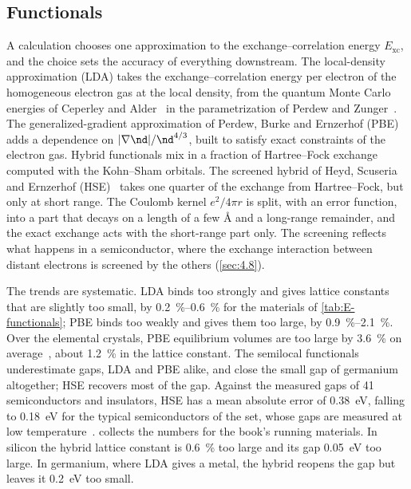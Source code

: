 \subsection{Functionals}

A calculation chooses one approximation to the exchange--correlation energy $E_{\mathrm{xc}}$, and the choice sets the accuracy of everything downstream. The local-density approximation (LDA) takes the exchange--correlation energy per electron of the homogeneous electron gas at the local density, from the quantum Monte Carlo energies of Ceperley and Alder~\cite{ceperley1980ground} in the parametrization of Perdew and Zunger~\cite{perdew1981self}. The generalized-gradient approximation of Perdew, Burke and Ernzerhof (PBE)~\cite{perdew1996generalized} adds a dependence on $|\nabla\nd|/\nd^{4/3}$, built to satisfy exact constraints of the electron gas. Hybrid functionals mix in a fraction of Hartree--Fock exchange computed with the Kohn--Sham orbitals. The screened hybrid of Heyd, Scuseria and Ernzerhof (HSE)~\cite{heyd2003hybrid} takes one quarter of the exchange from Hartree--Fock, but only at short range. The Coulomb kernel $e^2/4\pi r$ is split, with an error function, into a part that decays on a length of a few \AA{} and a long-range remainder, and the exact exchange acts with the short-range part only. The screening reflects what happens in a semiconductor, where the exchange interaction between distant electrons is screened by the others (\cref{sec:4.8}).

The trends are systematic. LDA binds too strongly and gives lattice constants that are slightly too small, by \SIrange{0.2}{0.6}{\percent} for the materials of \cref{tab:E-functionals}; PBE binds too weakly and gives them too large, by \SIrange{0.9}{2.1}{\percent}. Over the elemental crystals, PBE equilibrium volumes are too large by \SI{3.6}{\percent} on average~\cite[Table~IV]{lejaeghere2014error}, about \SI{1.2}{\percent} in the lattice constant. The semilocal functionals underestimate gaps, LDA and PBE alike, and close the small gap of germanium altogether; HSE recovers most of the gap. Against the measured gaps of 41 semiconductors and insulators, HSE has a mean absolute error of \SI{0.38}{eV}, falling to \SI{0.18}{eV} for the typical semiconductors of the set, whose gaps are measured at low temperature~\cite[Table~I and text]{garza2016predicting}.  collects the numbers for the book's running materials. In silicon the hybrid lattice constant is \SI{0.6}{\percent} too large and its gap \SI{0.05}{eV} too large. In germanium, where LDA gives a metal, the hybrid reopens the gap but leaves it \SI{0.2}{eV} too small.


